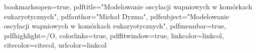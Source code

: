 \usepackage[utf8]{inputenc} %
\usepackage[T1]{fontenc}

\usepackage{textcomp} %
\usepackage{verbatim,amsmath,mathtools,amsfonts,amssymb,amsthm,bm}
\usepackage[english,polish]{babel}

\usepackage{color}
\usepackage[a4paper,hyperindex=true]{hyperref} %

\hypersetup
{
bookmarksopen=true,
pdftitle="Modelowanie oscylacji wapniowych w komórkach eukaryotycznych",
pdfauthor="Michał Dyzma", 
pdfsubject="Modelowanie oscylacji wapniowych w komórkach eukaryotycznych", %
pdfmenubar=true, %
pdfhighlight=/O, %
colorlinks=true, %
pdffitwindow=true, %
linkcolor=linkcol, %
citecolor=citecol, %
urlcolor=linkcol %
}

\usepackage{url}
\usepackage{color}
\usepackage{fix-cm}
\usepackage{setspace}  %
\usepackage{ae,aecompl}
\usepackage{lipsum} %
\usepackage{titling}
\usepackage{xcolor}
\usepackage[version=3]{mhchem}
\usepackage{indentfirst}
\usepackage{lscape} %
\usepackage{latexsym}
\setcounter{MaxMatrixCols}{10}
\usepackage{eqnarray}




\usepackage{tikz}

\usepackage{titlesec, blindtext}


